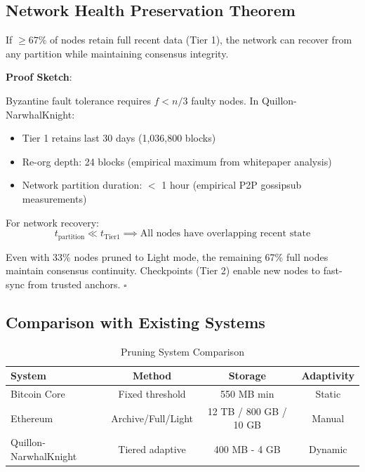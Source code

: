 \documentclass[11pt,a4paper]{article}
\begin{document}
\subsection{Network Health Preservation Theorem}

\begin{tcolorbox}[colback=blue!5!white, colframe=quantumblue, title=Theorem: Network Health Under Adaptive Pruning]
If $\geq 67\%$ of nodes retain full recent data (Tier 1), the network can recover from any partition while maintaining consensus integrity.
\end{tcolorbox}

\textbf{Proof Sketch}:

Byzantine fault tolerance requires $f < n/3$ faulty nodes. In Quillon-NarwhalKnight:
\begin{itemize}
    \item Tier 1 retains last 30 days (1,036,800 blocks)
    \item Re-org depth: 24 blocks (empirical maximum from whitepaper analysis)
    \item Network partition duration: $<$ 1 hour (empirical P2P gossipsub measurements)
\end{itemize}

For network recovery:
\begin{equation}
t_{\text{partition}} \ll t_{\text{Tier1}} \implies \text{All nodes have overlapping recent state}
\end{equation}

Even with 33\% nodes pruned to Light mode, the remaining 67\% full nodes maintain consensus continuity. Checkpoints (Tier 2) enable new nodes to fast-sync from trusted anchors. $\square$

\subsection{Comparison with Existing Systems}

\begin{table}[H]
\centering
\caption{Pruning System Comparison}
\begin{tabular}{|l|c|c|c|}
\hline
\textbf{System} & \textbf{Method} & \textbf{Storage} & \textbf{Adaptivity} \\
\hline
Bitcoin Core & Fixed threshold & 550 MB min & Static \\
Ethereum & Archive/Full/Light & 12 TB / 800 GB / 10 GB & Manual \\
Quillon-NarwhalKnight & Tiered adaptive & 400 MB - 4 GB & Dynamic \\
\hline
\end{tabular}
\label{tab:pruning-comparison}
\end{table}
\end{document}
